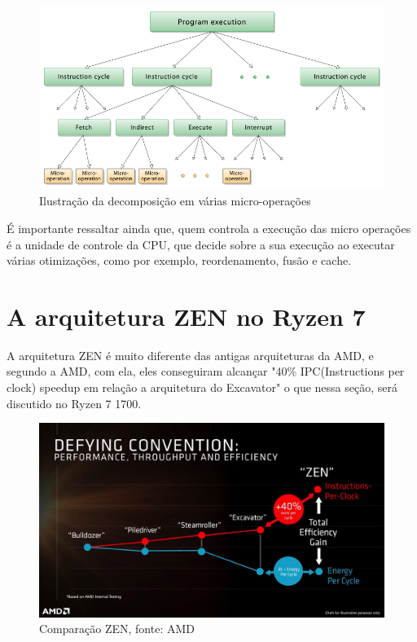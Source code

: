 \documentclass[12pt]{article}
\begin{document}
\begin{figure}[H]
\centering
\includegraphics[width=115mm,scale=0.8]{Micro-operations.png}
\caption{Ilustração da decomposição em várias micro-operações}
\label{fig:AMD CORE}
\end{figure}

É importante ressaltar ainda que, quem controla a execução das micro operações é a unidade de controle da CPU, que decide sobre a sua execução ao executar várias otimizações, como por exemplo, reordenamento, fusão e cache.

\newpage

\section{A arquitetura ZEN no Ryzen 7}

A arquitetura ZEN é muito diferente das antigas arquiteturas da AMD, e segundo a AMD, com ela, eles conseguiram alcançar "40\% IPC(Instructions per clock) speedup em relação a arquitetura do  Excavator" o que nessa seção, será discutido no Ryzen 7 1700.\\

\begin{figure}[H]
\centering
\includegraphics[width=120mm,scale=0.8]{AMD-energy-per-cycle.jpg}
\caption{Comparação ZEN, fonte: AMD}
\label{fig:AMD CORE}
\end{figure}
\end{document}
